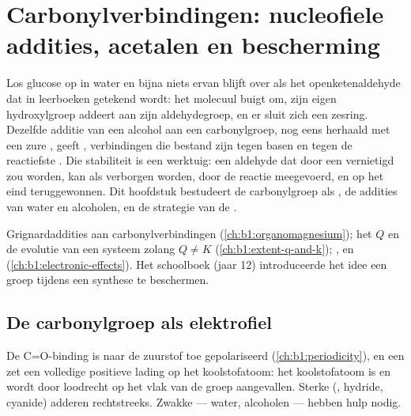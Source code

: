 \chapter{Carbonylverbindingen: nucleofiele addities, acetalen en bescherming}\label{ch:b1:acetals-protection}

Los glucose op in water en bijna niets ervan blijft over als het
openketenaldehyde dat in leerboeken getekend wordt: het molecuul buigt
om, zijn eigen hydroxylgroep addeert aan zijn aldehydegroep, en er sluit
zich een zesring. Dezelfde additie van een alcohol aan een carbonylgroep,
nog eens herhaald met een zure , geeft , verbindingen
die bestand zijn tegen basen en tegen de reactiefste . Die
stabiliteit is een werktuig: een aldehyde dat door een 
vernietigd zou worden, kan als  verborgen worden, door de reactie
meegevoerd, en op het eind teruggewonnen. Dit hoofdstuk bestudeert de
carbonylgroep als , de addities van water en alcoholen, en de
strategie van de .

\begin{recall}
Grignardaddities aan carbonylverbindingen (\cref{ch:b1:organomagnesium});
het  $Q$ en de evolutie van een systeem zolang $Q \neq K$
(\cref{ch:b1:extent-q-and-k}); ,  en
 (\cref{ch:b1:electronic-effects}). Het schoolboek (jaar
12) introduceerde het idee een groep tijdens een synthese te beschermen.
\end{recall}

\section{De carbonylgroep als elektrofiel}

De C=O-binding is naar de zuurstof toe gepolariseerd
(\cref{ch:b1:periodicity}), en een   zet een
volledige positieve lading op het koolstofatoom: het koolstofatoom is
 en wordt door  loodrecht op het vlak van de groep
aangevallen. Sterke  (, hydride, cyanide)
adderen rechtstreeks. Zwakke  --- water, alcoholen --- hebben
hulp nodig.

